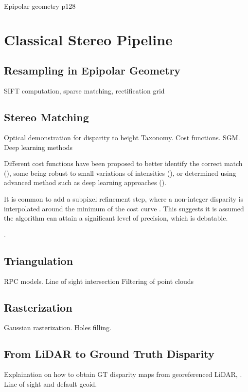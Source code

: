 
Epipolar geometry p128 \cite{cnes_imagerie_2008}

\section{Classical Stereo Pipeline}\label{sec:classical_stero_pipeline}
\subsection{Resampling in Epipolar Geometry}
SIFT computation, sparse matching, rectification grid

\subsection{Stereo Matching}
Optical demonstration for disparity to height
Taxonomy. Cost functions. SGM. Deep learning methods

Different cost functions have been proposed to better identify the correct match (\cite{hannah_computer_1994}), some being robust to small variations of intensities (\cite{zabih_non-parametric_1994}), or determined using advanced method such as deep learning approaches (\cite{zbontar_stereo_2016, laga_survey_2022}).

It is common to add a subpixel refinement step, where a non-integer disparity is interpolated around the minimum of the cost curve \cite{haller_real-time_2010}. This suggests it is assumed the algorithm can attain a significant level of precision, which is debatable. 


. 

\subsection{Triangulation}
RPC models. Line of sight intersection
Filtering of point clouds

\subsection{Rasterization}
Gaussian rasterization. Holes filling.  

\subsection{From LiDAR to Ground Truth Disparity}
Explaination on how to obtain GT disparity maps from georeferenced LiDAR, \cite{cournet_ground_2020}. Line of sight and default geoid. 


